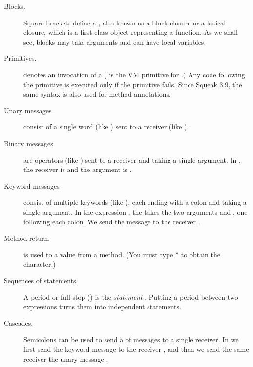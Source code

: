 \documentclass[a4paper,10pt,twoside]{book}
\begin{document}
\begin{description}
\item[Blocks.] Square brackets \ct{[ ]} define a , also known as a block closure or a lexical closure, which is a first-class object representing a function.
		As we shall see, blocks may take arguments and can have local variables.

\item[Primitives.]	 denotes an invocation of a  
	( is the VM primitive for .)
	Any code following the primitive is executed only if the primitive fails. Since Squeak 3.9, the same syntax is also used for method annotations.

\item[Unary messages] consist of a single word (like ) sent to a receiver (like ).

\item[Binary messages] are operators (like \ct{+}) sent to a receiver and taking a single argument. In , the receiver is  and the argument is .

\item[Keyword messages] consist of multiple keywords (like ), each ending with a colon and taking a single argument. 
In the expression , the   takes the two arguments  and , one following each colon.  We send the message to the receiver .

\item[Method return.] \ct{^} is used to  a value from a method.  (You must type \verb|^| to obtain the \ct{^} character.)

\item[Sequences of statements.]	A period or full-stop () is the \emph{statement} . Putting a period between two expressions turns them into independent statements.	

\item[Cascades.] Semicolons can be used to send a  of messages to a single receiver.  In  we first send the keyword message  to the receiver , and then we send the same receiver the unary message .

\end{description}
\end{document}
